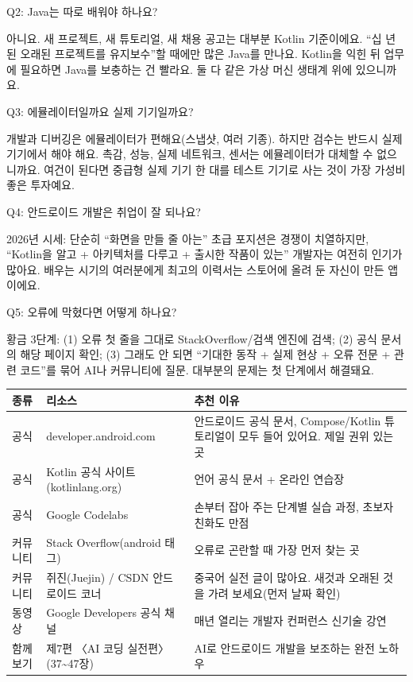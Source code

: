 Q2: Java는 따로 배워야 하나요?

아니요. 새 프로젝트, 새 튜토리얼, 새 채용 공고는 대부분 Kotlin 기준이에요. “십 년 된 오래된 프로젝트를 유지보수”할 때에만 많은 Java를 만나요. Kotlin을 익힌 뒤 업무에 필요하면 Java를 보충하는 건 빨라요. 둘 다 같은 가상 머신 생태계 위에 있으니까요.

Q3: 에뮬레이터일까요 실제 기기일까요?

개발과 디버깅은 에뮬레이터가 편해요(스냅샷, 여러 기종). 하지만 검수는 반드시 실제 기기에서 해야 해요. 촉감, 성능, 실제 네트워크, 센서는 에뮬레이터가 대체할 수 없으니까요. 여건이 된다면 중급형 실제 기기 한 대를 테스트 기기로 사는 것이 가장 가성비 좋은 투자예요.

Q4: 안드로이드 개발은 취업이 잘 되나요?

2026년 시세: 단순히 “화면을 만들 줄 아는” 초급 포지션은 경쟁이 치열하지만, “Kotlin을 알고 + 아키텍처를 다루고 + 출시한 작품이 있는” 개발자는 여전히 인기가 많아요. 배우는 시기의 여러분에게 최고의 이력서는 스토어에 올려 둔 자신이 만든 앱이에요.

Q5: 오류에 막혔다면 어떻게 하나요?

황금 3단계: (1) 오류 첫 줄을 그대로 StackOverflow/검색 엔진에 검색; (2) 공식 문서의 해당 페이지 확인; (3) 그래도 안 되면 “기대한 동작 + 실제 현상 + 오류 전문 + 관련 코드”를 묶어 AI나 커뮤니티에 질문. 대부분의 문제는 첫 단계에서 해결돼요.


\begin{center}
\begin{tabularx}{\linewidth}{|X|X|X|}
\hline
\textbf{종류} & \textbf{리소스} & \textbf{추천 이유} \tabularnewline
\hline
공식 & developer.android.com & 안드로이드 공식 문서, Compose/Kotlin 튜토리얼이 모두 들어 있어요. 제일 권위 있는 곳 \tabularnewline
공식 & Kotlin 공식 사이트(kotlinlang.org) & 언어 공식 문서 + 온라인 연습장 \tabularnewline
공식 & Google Codelabs & 손부터 잡아 주는 단계별 실습 과정, 초보자 친화도 만점 \tabularnewline
커뮤니티 & Stack Overflow(android 태그) & 오류로 곤란할 때 가장 먼저 찾는 곳 \tabularnewline
커뮤니티 & 쥐진(Juejin) / CSDN 안드로이드 코너 & 중국어 실전 글이 많아요. 새것과 오래된 것을 가려 보세요(먼저 날짜 확인) \tabularnewline
동영상 & Google Developers 공식 채널 & 매년 열리는 개발자 컨퍼런스 신기술 강연 \tabularnewline
함께 보기 & 제7편 〈AI 코딩 실전편〉(37\textasciitilde{}47장) & AI로 안드로이드 개발을 보조하는 완전 노하우 \tabularnewline
\hline
\end{tabularx}
\end{center}


